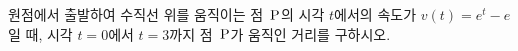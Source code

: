 \hspace*{2mm}\begin{minipage}[t]{\dimexpr\linewidth-2mm\relax}\vspace{0pt}
원점에서 출발하여 수직선 위를 움직이는 점~$\mathrm{P}$의 시각 $t$에서의 속도가 $v(t)=e^t-e$일 때, 시각 $t=0$에서 $t=3$까지 점~$\mathrm{P}$가 움직인 거리를 구하시오.\end{minipage}
